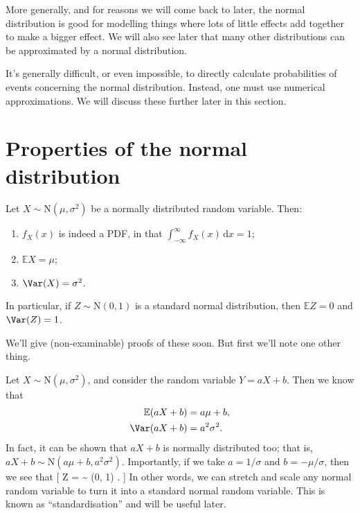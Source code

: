 \documentclass[
  letterpaper,
  DIV=11,
  numbers=noendperiod]{scrreprt}
\providecommand{\tightlist}{%
  \setlength{\itemsep}{0pt}\setlength{\parskip}{0pt}}\usepackage{longtable,booktabs,array}
\theoremstyle{remark}
\begin{document}
More generally, and for reasons we will come back to later, the normal
distribution is good for modelling things where lots of little effects
add together to make a bigger effect. We will also see later that many
other distributions can be approximated by a normal distribution.

It's generally difficult, or even impossible, to directly calculate
probabilities of events concerning the normal distribution. Instead, one
must use numerical approximations. We will discuss these further later
in this section.

\hypertarget{normal-properties}{%
\section{Properties of the normal
distribution}\label{normal-properties}}

\leavevmode{}%
Let \(X \sim \mathrm{N}(\mu, \sigma^2)\) be a normally distributed
random variable. Then:

\begin{enumerate}
\def\labelenumi{\arabic{enumi}.}
\tightlist
\item
  \(f_X(x)\) is indeed a PDF, in that
  \(\displaystyle\int_{-\infty}^\infty f_X(x)\,\mathrm dx = 1\);
\item
  \(\mathbb EX = \mu\);
\item
  \(\Var(X) = \sigma^2\).
\end{enumerate}

In particular, if \(Z \sim \mathrm{N}(0, 1)\) is a standard normal
distribution, then \(\mathbb EZ = 0\) and \(\Var(Z) = 1\).

We'll give (non-examinable) proofs of these soon. But first we'll note
one other thing.

Let \(X \sim \mathrm{N}(\mu, \sigma^2)\), and consider the random
variable \(Y = aX + b\). Then we know that \begin{align*}
\mathbb E(aX + b) &= a\mu + b , \\
\Var(aX + b) &= a^2 \sigma^2 .
\end{align*} In fact, it can be shown that \(aX + b\) is normally
distributed too; that is,
\(aX + b \sim \mathrm{N}(a\mu + b, a^2 \sigma^2)\). Importantly, if we
take \(a = 1/\sigma\) and \(b = -\mu/\sigma\), then we see that {[} Z =
 \sim {} (0, 1) . {]} In other words, we can
stretch and scale any normal random variable to turn it into a standard
normal random variable. This is known as ``standardisation'' and will be
useful later.
\end{document}
